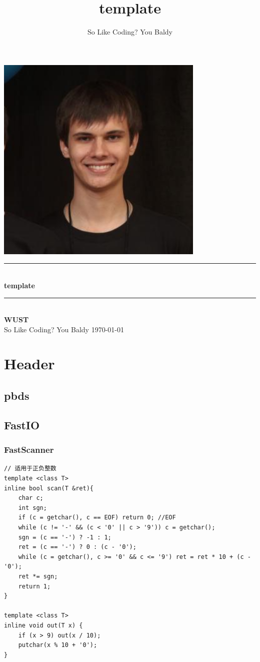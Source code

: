 \documentclass[twoside]{article}
\title{template}
\author{So Like Coding? You Baldy}
\newcommand{\HRule}{\rule{\linewidth}{0.5mm}}
\begin{document}
\small
\begin{titlepage}
\begin{center}
\vspace*{0.5cm}\includegraphics[width=0.75\textwidth]{logo.jpg} \\ [2cm]
\HRule \\ [1cm]
\textbf{\Huge{template}} \\ [0.5cm]
\HRule \\ [4cm]
\textbf{\Huge{WUST}} \\ [1cm]
\LARGE{So Like Coding? You Baldy}
\vfill
\Large{\today}
\end{center}
\clearpage
\end{titlepage}
\tableofcontents\clearpage
\pagestyle{fancy}
\lfoot{}
\cfoot{\thepage}\rfoot{}
\setcounter{section}{-1}
\setcounter{page}{1}
\clearpage\section{Header}
\subsection{pbds}
\subsection{FastIO}
\subsubsection{FastScanner}
\begin{lstlisting}
// 适用于正负整数
template <class T>
inline bool scan(T &ret){
    char c;
    int sgn;
    if (c = getchar(), c == EOF) return 0; //EOF
    while (c != '-' && (c < '0' || c > '9')) c = getchar();
    sgn = (c == '-') ? -1 : 1;
    ret = (c == '-') ? 0 : (c - '0');
    while (c = getchar(), c >= '0' && c <= '9') ret = ret * 10 + (c - '0');
    ret *= sgn;
    return 1;
}

template <class T>
inline void out(T x) {
    if (x > 9) out(x / 10);
    putchar(x % 10 + '0');
}\end{lstlisting}
\end{document}
